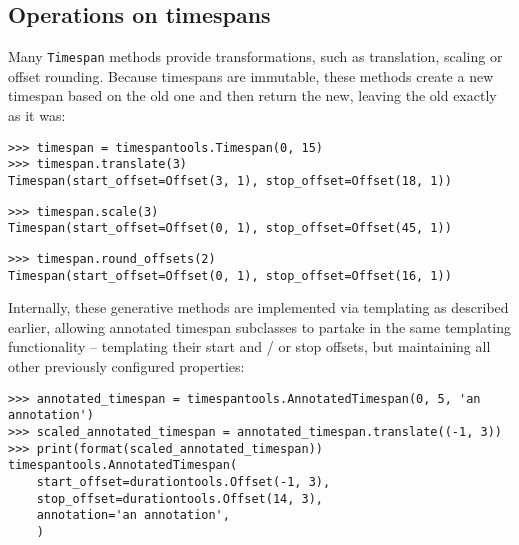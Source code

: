 \subsection{Operations on timespans} %

Many \texttt{Timespan} methods provide transformations, such as translation,
scaling or offset rounding. Because timespans are immutable, these methods
create a new timespan based on the old one and then return the new, leaving
the old exactly as it was:

\begin{comment}
<abjad>
timespan = timespantools.Timespan(0, 15)
timespan.translate(3)
timespan.scale(3)
timespan.round_offsets(2)
</abjad>
\end{comment}

\begin{singlespacing}
\vspace{-0.5\baselineskip}
\begin{lstlisting}
>>> timespan = timespantools.Timespan(0, 15)
>>> timespan.translate(3)
Timespan(start_offset=Offset(3, 1), stop_offset=Offset(18, 1))
\end{lstlisting}
\begin{lstlisting}
>>> timespan.scale(3)
Timespan(start_offset=Offset(0, 1), stop_offset=Offset(45, 1))
\end{lstlisting}
\begin{lstlisting}
>>> timespan.round_offsets(2)
Timespan(start_offset=Offset(0, 1), stop_offset=Offset(16, 1))
\end{lstlisting}
\end{singlespacing}

\noindent Internally, these generative methods are implemented via templating
as described earlier, allowing annotated timespan subclasses to partake in the
same templating functionality -- templating their start and / or stop offsets,
but maintaining all other previously configured properties:

\begin{comment}
<abjad>
annotated_timespan = timespantools.AnnotatedTimespan(0, 5, 'an annotation')
scaled_annotated_timespan = annotated_timespan.translate((-1, 3))
print(format(scaled_annotated_timespan))
</abjad>
\end{comment}

\begin{singlespacing}
\vspace{-0.5\baselineskip}
\begin{lstlisting}
>>> annotated_timespan = timespantools.AnnotatedTimespan(0, 5, 'an annotation')
>>> scaled_annotated_timespan = annotated_timespan.translate((-1, 3))
>>> print(format(scaled_annotated_timespan))
timespantools.AnnotatedTimespan(
    start_offset=durationtools.Offset(-1, 3),
    stop_offset=durationtools.Offset(14, 3),
    annotation='an annotation',
    )
\end{lstlisting}
\end{singlespacing}

